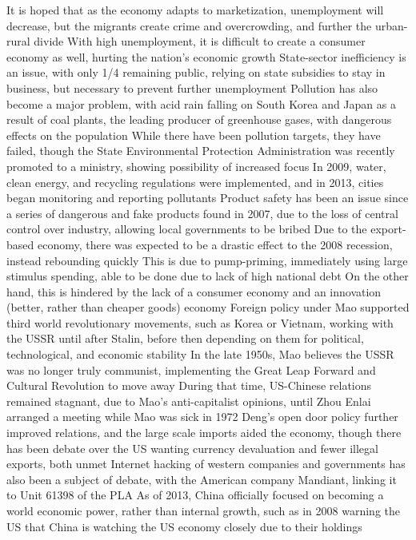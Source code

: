 \documentclass[11 pt, twoside]{article}
\newenvironment{outline*}
{
	\begin{outline}[enumerate]
	}
	{\end{outline}
}
\begin{document}
\begin{outline*}
\3 It is hoped that as the economy adapts to marketization, unemployment will decrease, but the migrants create crime and overcrowding, and further the urban-rural divide
\3 With high unemployment, it is difficult to create a consumer economy as well, hurting the nation's economic growth
\2 State-sector inefficiency is an issue, with only 1/4 remaining public, relying on state subsidies to stay in business, but necessary to prevent further unemployment
\2 Pollution has also become a major problem, with acid rain falling on South Korea and Japan as a result of coal plants, the leading producer of greenhouse gases, with dangerous effects on the population
\3 While there have been pollution targets, they have failed, though the State Environmental Protection Administration was recently promoted to a ministry, showing possibility of increased focus
\3 In 2009, water, clean energy, and recycling regulations were implemented, and in 2013, cities began monitoring and reporting pollutants
\2 Product safety has been an issue since a series of dangerous and fake products found in 2007, due to the loss of central control over industry, allowing local governments to be bribed
\2 Due to the export-based economy, there was expected to be a drastic effect to the 2008 recession, instead rebounding quickly
\3 This is due to pump-priming, immediately using large stimulus spending, able to be done due to lack of high national debt
\3 On the other hand, this is hindered by the lack of a consumer economy and an innovation (better, rather than cheaper goods) economy
\1 Foreign policy under Mao supported third world revolutionary movements, such as Korea or Vietnam, working with the USSR until after Stalin, before then depending on them for political, technological, and economic stability
\2 In the late 1950s, Mao believes the USSR was no longer truly communist, implementing the Great Leap Forward and Cultural Revolution to move away
\2 During that time, US-Chinese relations remained stagnant, due to Mao's anti-capitalist opinions, until Zhou Enlai arranged a meeting while Mao was sick in 1972
\3 Deng's open door policy further improved relations, and the large scale imports aided the economy, though there has been debate over the US wanting currency devaluation and fewer illegal exports, both unmet
\3 Internet hacking of western companies and governments has also been a subject of debate, with the American company Mandiant, linking it to Unit 61398 of the PLA
\2 As of 2013, China officially focused on becoming a world economic power, rather than internal growth, such as in 2008 warning the US that China is watching the US economy closely due to their holdings

\end{outline*}
\end{document}
